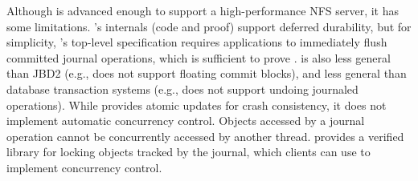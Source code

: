 Although \txn is advanced enough to support a high-performance NFS
server, it has some limitations.  \txn's internals (code and proof)
support deferred durability, but for simplicity, \txn's top-level
specification requires applications to immediately flush committed
journal operations, which is sufficient to prove \simplenfs.  \txn is also
less general than JBD2 (e.g., \txn does not support floating commit
blocks), and less general than database transaction systems (e.g.,
\txn does not support undoing journaled operations).
While \txn provides atomic updates for crash consistency, it does not
implement automatic concurrency control. Objects accessed by a journal operation
cannot be concurrently accessed by another thread.
\txn provides a verified library for locking objects tracked by the journal, which clients
can use to implement concurrency control.

